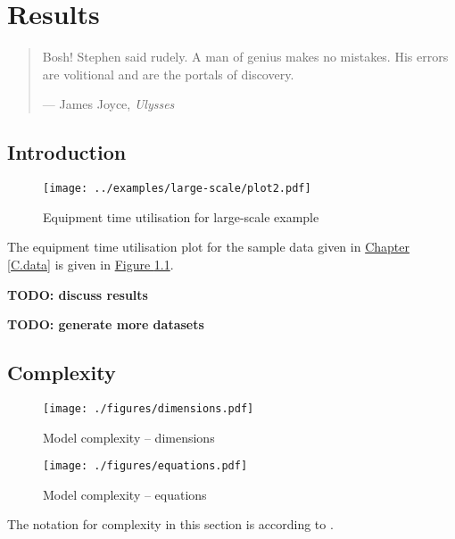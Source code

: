 %
%
%
%

\chapter{Results}\label{C.results}

\begin{quote}
Bosh! Stephen said rudely.
A man of genius makes no mistakes.
His errors are volitional and are the portals of discovery.

\hspace{2cm}--- James Joyce, \emph{Ulysses}
\end{quote}

\section{Introduction}\label{S.intro5}
\begin{figure}
    \centering
    \texttt{[image: ../examples/large-scale/plot2.pdf]}
    \caption{Equipment time utilisation for large-scale example}
    \label{fig.etu}
\end{figure}
The equipment time utilisation plot for the sample data given in 
\hyperref[C.data]{Chapter \ref*{C.data}} is given in
\hyperref[fig.etu]{Figure \ref*{fig.etu}}.

\textbf{TODO: discuss results}

\textbf{TODO: generate more datasets}

\section{Complexity}\label{S.complexity}
\begin{figure}
    \centering
    \texttt{[image: ./figures/dimensions.pdf]}
    \caption{Model complexity -- dimensions}
    \label{fig.dims}
\end{figure}
\begin{figure}
    \centering
    \texttt{[image: ./figures/equations.pdf]}
    \caption{Model complexity -- equations}
    \label{fig.eqns}
\end{figure}
The notation for complexity in this section is according to \citet{Knuth:1976}.

